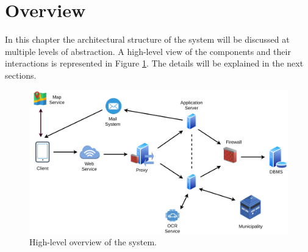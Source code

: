 \documentclass{report}
\begin{document}
\section{Overview}
In this chapter the architectural structure of the system will be discussed at multiple levels of abstraction. A high-level view of the components and their interactions is represented in Figure \ref{fig:overview}. The details will be explained in the next sections.
\begin{figure}[!ht]
	\begin{center}
	\includegraphics[width=\textwidth]{img/HighLevelOverview.png}
    \end{center}
    \label{fig:overview}
	\caption{High-level overview of the system.}
\end{figure}
\newpage
\end{document}
